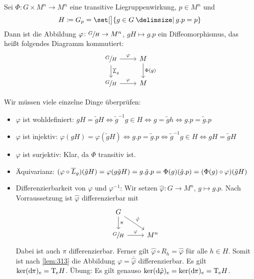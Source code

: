 \begin{lemma}[label=lem:316,{name=[$G$-äquivarianter Diffeo mit Standgruppe]}]
	Sei $\Phi \colon G \times M^n \to M^n$ eine transitive Liegruppenwirkung, $p \in M^n$ und 
	\[
		H \coloneqq G_p = \set[\big]{g \in G \given g.p=p}
	\]
	Dann ist die Abbildung $\varphi \colon \sfrac{G}{H} \to M^n$, $gH \mapsto g.p$ ein  Diffeomorphismus, das heißt folgendes Diagramm kommutiert:
	\[
		\begin{tikzcd}
			\sfrac{G}{H} \dar["\overline{L}_g"] \rar["\varphi"] & M \dar["\Phi(g)"] \\
			\sfrac{G}{H} \rar["\varphi"] & M
		\end{tikzcd}
	\]
\end{lemma}
\begin{beweis}
	Wir müssen viele einzelne Dinge überprüfen:
	\begin{itemize}[itemsep=1pt]
		\item $\varphi$ ist wohldefiniert: $gH = \tilde{g}H \iff \tilde{g}^{-1}g \in H \iff g = \tilde{g}h \iff g.p = \tilde{g}.p$
		\item $\varphi$ ist injektiv: $\varphi(gH) = \varphi(\tilde{g}H) \iff g.p = \tilde{g}.p \iff \tilde{g}^{-1}g \in H \iff gH = \tilde{g}H$
		\item $\varphi$ ist surjektiv: Klar, da $\Phi$ transitiv ist.
		\item Äquivarianz: 
		\(
			(\varphi \circ \overline{L}_g)(\tilde{g}H) = \varphi \enbrace*{g \tilde{g}H} = g.\tilde{g}.p = \Phi(g) \enbrace*{\tilde{g}.p} = \enbrace*{\Phi(g) \circ \varphi}(\tilde{g}H)
		\)
		\item Differenzierbarkeit von $\varphi$ und $\varphi^{-1}$:
		Wir setzen $\hat{\varphi} \colon G \to M^n$, $g \mapsto g.p$.
		Nach Vorraussetzung ist $\hat{\varphi}$ differenzierbar mit 
		\[
			\begin{tikzcd}
				G \drar["\hat{\varphi}"] \dar["\pi"] & \\
				\sfrac{G}{H} \rar["\varphi"] & M^n
			\end{tikzcd}
		\]
		Dabei ist auch $\pi$ differenzierbar.
		Ferner gilt $\hat{\varphi} \circ R_h = \hat{\varphi}$ für alle $h \in H$.
		Somit ist nach \autoref{lem:313} die Abbildung $\varphi = \overline{\hat{\varphi}}$ differenzierbar.
		Es gilt $\ker (\mathrm{d}\mkern-1.0mu \pi)_e = \mathrm{T}\mkern-0.85mu_e H$.
		Übung: Es gilt genauso $\ker (\mathrm{d}\mkern-1.0mu \hat{\varphi})_e = \ker (\mathrm{d}\mkern-1.0mu \pi)_e = \mathrm{T}\mkern-0.85mu_e H$.
		

\end{itemize}
\end{beweis}

